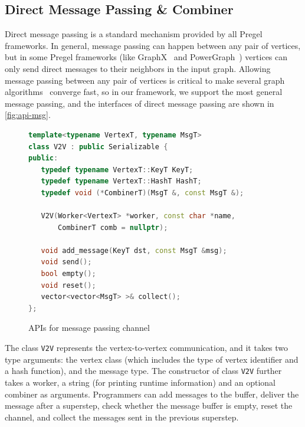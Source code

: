 \documentclass{sokendai_thesis} %
\begin{document}

\subsection{Direct Message Passing \& Combiner}

Direct message passing is a standard mechanism provided by all Pregel frameworks.
In general, message passing can happen between any pair of vertices, but in some Pregel frameworks (like GraphX~\cite{graphx} and PowerGraph~\cite{powergraph}) vertices can only send direct messages to their neighbors in the input graph.
Allowing message passing between any pair of vertices is critical to make several graph algorithms~\cite{connectivity, pregelplus} converge fast,
so in our framework, we support the most general message passing, and the interfaces of direct message passing are shown in \autoref{fig:api-msg}.

\begin{figure}[ht]
\centering
\vspace{-2ex}
\begin{lstlisting}[basicstyle=\small\ttfamily,
numbers=none,language=c++,xleftmargin=0.1\textwidth]
template<typename VertexT, typename MsgT>
class V2V : public Serializable {
public:
   typedef typename VertexT::KeyT KeyT;
   typedef typename VertexT::HashT HashT;
   typedef void (*CombinerT)(MsgT &, const MsgT &);

   V2V(Worker<VertexT> *worker, const char *name,
       CombinerT comb = nullptr);

   void add_message(KeyT dst, const MsgT &msg);
   void send();
   bool empty();
   void reset();
   vector<vector<MsgT> >& collect();
};
\end{lstlisting}
\vspace{-2ex}
\caption{APIs for message passing channel}
\label{fig:api-msg}
\end{figure}

The class \texttt{V2V} represents the vertex-to-vertex communication, and it takes two type arguments: the vertex class (which includes the type of vertex identifier and a hash function), and the message type.
The constructor of class \texttt{V2V} further takes a worker, a string (for printing runtime information) and an optional combiner as arguments.
Programmers can add messages to the buffer, deliver the message after a superstep, check whether the message buffer is empty, reset the channel, and collect the messages sent in the previous superstep.
\end{document}
